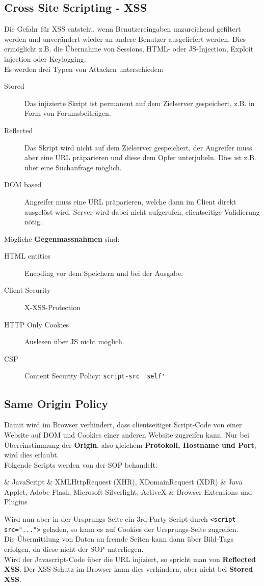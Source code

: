 \subsection{Cross Site Scripting - XSS}
Die Gefahr für XSS entsteht, wenn Benutzereingaben unzureichend gefiltert werden und unverändert wieder an andere Benutzer ausgeliefert werden. Dies ermöglicht z.B. die Übernahme von Sessions, HTML- oder JS-Injection, Exploit injection oder Keylogging.\\
Es werden drei Typen von Attacken unterschieden:
\begin{description}
	\item[Stored] Das injizierte Skript ist permanent auf dem Zielserver gespeichert, z.B. in Form von Forumsbeiträgen.
	\item[Reflected] Das Skript wird nicht auf dem Zielserver gespeichert, der Angreifer muss aber eine URL präparieren und diese dem Opfer unterjubeln. Dies ist z.B. über eine Suchanfrage möglich.
	\item[DOM based] Angreifer muss eine URL präparieren, welche dann im Client direkt ausgelöst wird. Server wird dabei nicht aufgerufen, clientseitige Validierung nötig.
\end{description}

Mögliche \textbf{Gegenmassnahmen} sind:
\begin{description}
	\item[HTML entities] Encoding vor dem Speichern und bei der Ausgabe.
	\item[Client Security] X-XSS-Protection
	\item[HTTP Only Cookies] Auslesen über JS nicht möglich.
	\item[CSP] Content Security Policy: \lstinline|script-src 'self'|
\end{description}

\subsection{Same Origin Policy}
Damit wird im Browser verhindert, dass clientseitiger Script-Code von einer Website auf DOM und Cookies einer anderen Website zugreifen kann. Nur bei Übereinstimmung der \textbf{Origin}, also gleichem \textbf{Protokoll, Hostname und Port}, wird dies erlaubt.\\
Folgende Scripts werden von der SOP behandelt:
\begin{easylist}[itemize]
	& JavaScript
	& XMLHttpRequest (XHR), XDomainRequest (XDR)
	& Java Applet, Adobe Flash, Microsoft Silverlight, ActiveX
	& Browser Extensions und Plugins
\end{easylist}
Wird nun aber in der Ursprungs-Seite ein 3rd-Party-Script durch \lstinline|<script src="...">| geladen, so kann es auf Cookies der Ursprungs-Seite zugreifen.\\
Die Übermittlung von Daten an fremde Seiten kann dann über Bild-Tags erfolgen, da diese nicht der SOP unterliegen.\\
Wird der Javascript-Code über die URL injiziert, so spricht man von \textbf{Reflected XSS}. Der XSS-Schutz im Browser kann dies verhindern, aber nicht bei \textbf{Stored XSS}.

